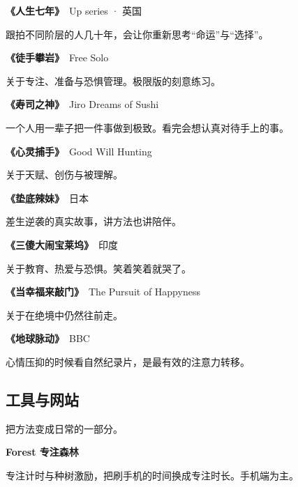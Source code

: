 \documentclass[a4paper,10pt]{article}
\renewcommand{\songti}{\CJKfamily{songpaper}}
\renewcommand{\kaishu}{\songti}
\begin{document}
\vspace{0.25\baselineskip}
\noindent\textbf{《人生七年》}　Up series · 英国\par
跟拍不同阶层的人几十年，会让你重新思考“命运”与“选择”。

\vspace{0.25\baselineskip}
\noindent\textbf{《徒手攀岩》}　Free Solo\par
关于专注、准备与恐惧管理。极限版的刻意练习。

\vspace{0.25\baselineskip}
\noindent\textbf{《寿司之神》}　Jiro Dreams of Sushi\par
一个人用一辈子把一件事做到极致。看完会想认真对待手上的事。

\vspace{0.25\baselineskip}
\noindent\textbf{《心灵捕手》}　Good Will Hunting\par
关于天赋、创伤与被理解。

\vspace{0.25\baselineskip}
\noindent\textbf{《垫底辣妹》}　日本\par
差生逆袭的真实故事，讲方法也讲陪伴。

\vspace{0.25\baselineskip}
\noindent\textbf{《三傻大闹宝莱坞》}　印度\par
关于教育、热爱与恐惧。笑着笑着就哭了。

\vspace{0.25\baselineskip}
\noindent\textbf{《当幸福来敲门》}　The Pursuit of Happyness\par
关于在绝境中仍然往前走。

\vspace{0.25\baselineskip}
\noindent\textbf{《地球脉动》}　BBC\par
心情压抑的时候看自然纪录片，是最有效的注意力转移。

\vspace{0.25\baselineskip}
\subsection*{工具与网站}
{\kaishu\small 把方法变成日常的一部分。}\par
{}
\noindent\textbf{Forest 专注森林}\par
专注计时与种树激励，把刷手机的时间换成专注时长。手机端为主。
\end{document}
